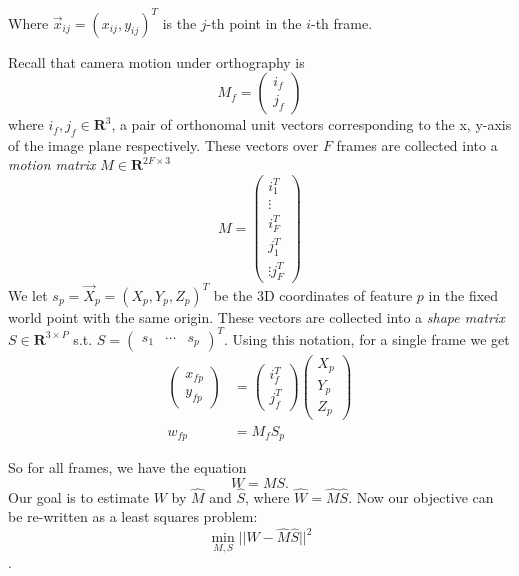 Where $\vec x_{ij} = (x_{ij}, y_{ij})^T$ is the $j$-th point in the
$i$-th frame. 

Recall that camera motion under orthography is $$M_f =
\begin{pmatrix}
  i_f\\
  j_f
\end{pmatrix}
$$ where $i_f, j_f \in \mathbf{R}^{3}$, a pair of orthonomal unit vectors
corresponding to the x, y-axis of the image plane respectively. These vectors over $F$ frames are collected into a
\emph{motion matrix} $M\in \mathbf{R}^{2F \times 3}$ $$M =
\begin{pmatrix}
  i_1^T\\ \vdots \\  i_F^T \\ j_1^T \\ \vdots j_F^T
\end{pmatrix}
$$
We let $s_p = \vec X_p = (X_p, Y_p, Z_p)^T$ be the 3D coordinates of feature $p$ in the fixed world point with the same origin. These vectors are collected into a
\emph{shape matrix} $S\in \mathbf{R}^{3 \times P}$ s.t. $S =
\begin{pmatrix}
  s_1 & \cdots & s_p
\end{pmatrix}^T$. Using this notation, for a single frame we get
\begin{align*}
  \begin{pmatrix}
    x_{fp}\\y_{fp}
  \end{pmatrix} &=
  \begin{pmatrix}
    i_{f}^T\\j_{f}^T
  \end{pmatrix}
  \begin{pmatrix}
    X_p\\ Y_p\\ Z_p
  \end{pmatrix}\\
w_{fp} &= M_fS_p  
\end{align*}

So for all frames, we have the equation $$W = MS.$$
Our goal is to estimate $W$ by $\hat M$ and $\hat S$, where $\hat W = \hat M
\hat S$.
Now our objective can be re-written as a least squares problem:
\begin{equation}
  \label{eq:fact3}
\min_{M, S}||W - \hat M \hat S||^2
\end{equation}
\cite{Morita}.
